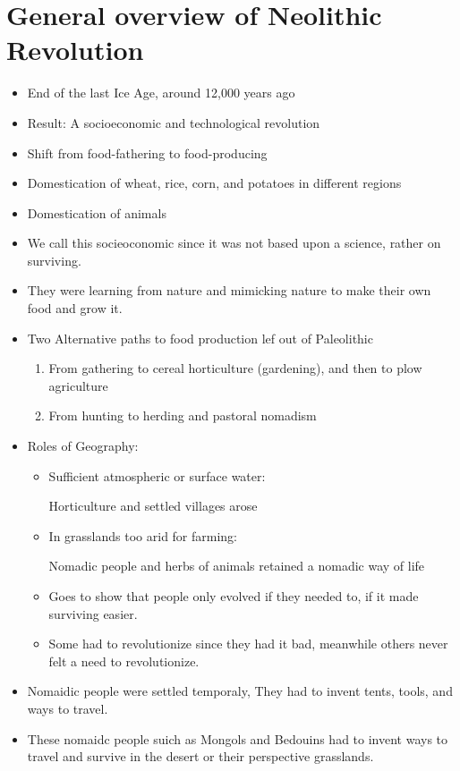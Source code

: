 \documentclass{article}
\begin{document}
\section*{General overview of Neolithic Revolution}
\begin{itemize}
  \item End of the last Ice Age, around 12,000 years ago
  \item Result: A socioeconomic and technological revolution
  \item Shift from food-fathering to food-producing
  \item Domestication of wheat, rice, corn, and potatoes in different regions
  \item Domestication of animals
  \item We call this socieoconomic since it was not based upon a science,
    rather on surviving.
  \item They were learning from nature and mimicking nature
    to make their own food and grow it.
  \item Two Alternative paths to food production lef out of Paleolithic
    \begin{enumerate}
      \item From gathering to cereal horticulture (gardening),
        and then to plow agriculture
      \item From hunting to herding and pastoral nomadism
    \end{enumerate}
  \item Roles of Geography:
    \begin{itemize}
      \item Sufficient atmospheric or surface water:

        Horticulture and settled villages arose
      \item In grasslands too arid for farming:

        Nomadic people and herbs of animals retained a nomadic way of life
      \item Goes to show that people only evolved if they needed to,
        if it made surviving easier.
      \item Some had to revolutionize since they had it bad,
        meanwhile others never felt a need to revolutionize.
    \end{itemize}
  \item Nomaidic people were settled temporaly,
    They had to invent tents, tools, and ways to travel.
  \item These nomaidc people suich as Mongols and Bedouins
    had to invent ways to travel and survive in the desert or their perspective grasslands.
\end{itemize}
\end{document}
